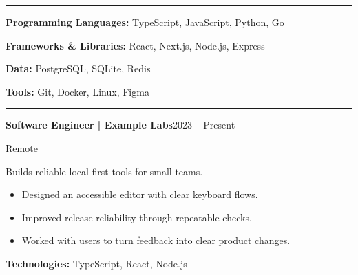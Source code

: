 \documentclass[10pt,a4paper]{article}
\newlength{\resumesectionwidth}
\newcommand{\ResumeSection}[3]{\par\addvspace{7pt}\settowidth{\resumesectionwidth}{\large\bfseries #1}\noindent{\large\bfseries\color{bodytext} #1}\par\vspace{1pt}\noindent\color{bodytext}\rule{#3}{#2}\color{bodytext}\par\vspace{2pt}}
\begin{document}
\fontsize{10pt}{12.00pt}\selectfont
\color{bodytext}
\raggedright
{}\par{}\par{}\par
\vspace{3pt}
\par\vspace{0pt}\begingroup\setlength{\leftskip}{0mm}\setlength{\rightskip}{0mm}\vspace{0pt}\fontsize{10pt}{12.00pt}\selectfont\ResumeSection{Skills}{0.45pt}{\dimexpr\linewidth-0mm-0mm\relax}
\par\noindent\textbf{Programming Languages:} TypeScript, JavaScript, Python, Go
\vspace{0pt}
\par\noindent\textbf{Frameworks \& Libraries:} React, Next.js, Node.js, Express
\vspace{0pt}
\par\noindent\textbf{Data:} PostgreSQL, SQLite, Redis
\vspace{0pt}
\par\noindent\textbf{Tools:} Git, Docker, Linux, Figma\par\vspace{0pt}\endgroup\par\vspace{0pt}
\medskip
\par\vspace{0pt}\begingroup\setlength{\leftskip}{0mm}\setlength{\rightskip}{0mm}\vspace{0pt}\fontsize{10pt}{12.00pt}\selectfont\ResumeSection{Experience}{0.45pt}{\dimexpr\linewidth-0mm-0mm\relax}
\par\smallskip\noindent\textbf{Software Engineer | Example Labs}\hfill{\small 2023 -- Present}\par{\small Remote}\par Builds reliable local-first tools for small teams.\begin{itemize}[leftmargin=4.4mm,itemsep=2pt,topsep=2pt]
\item Designed an accessible editor with clear keyboard flows.
\item Improved release reliability through repeatable checks.
\item Worked with users to turn feedback into clear product changes.\end{itemize}\par\textbf{Technologies:} TypeScript, React, Node.js\par\vspace{0pt}\endgroup\par\vspace{0pt}
\end{document}
